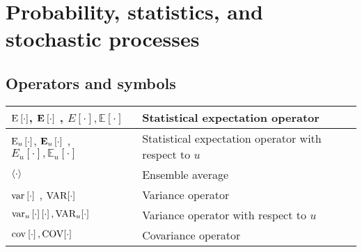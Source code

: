 \section{Probability, statistics, and stochastic processes}
\subsection{Operators and symbols}
\begin{xltabular}{\textwidth}{XX}
	\(\E{\cdot}\), \(\nossekE{\cdot}\) \cite{nossekAdaptiveArraySignal2015}, \(E\left[ \cdot \right], \mathbb{E}\left[ \cdot \right]\) \cite{dinizAdaptiveFilteringAlgorithms2002}           & Statistical expectation operator                                                                                            \\ \hline
	\(\E[u]{\cdot}\), \(\nossekE[u]{\cdot}\) \cite{nossekAdaptiveArraySignal2015}, \(E_u\left[ \cdot \right], \mathbb{E}_u\left[ \cdot \right]\) & Statistical expectation operator with respect to \(u\)                                                                                                                  \\ \hline
	\(\expval{\cdot}\)                                                                                                                           & Ensemble average                                                                                                                                                        \\ \hline
	\(\var{\cdot}\) \cite{nossekAdaptiveArraySignal2015}, \(\textnormal{VAR}[\cdot]\) \cite{haykinAdaptiveFilterTheory2002,leon-garciaProbabilityStatisticsRandom2007,proakisDigitalCommunications2007,bishopPatternRecognitionMachine2006}                                                                                                     & Variance operator \\ \hline
	\(\var[u]{\cdot} \left[ \cdot \right], \textnormal{VAR}_u[\cdot]\)                                                                           & Variance operator with respect to \(u\)                                                                                                                                 \\ \hline
	\(\cov{\cdot}, \textnormal{COV}[\cdot]\)                                                                                                     & Covariance operator \cite{bishopPatternRecognitionMachine2006}                                                                                                          \\ \hline

\end{xltabular}
